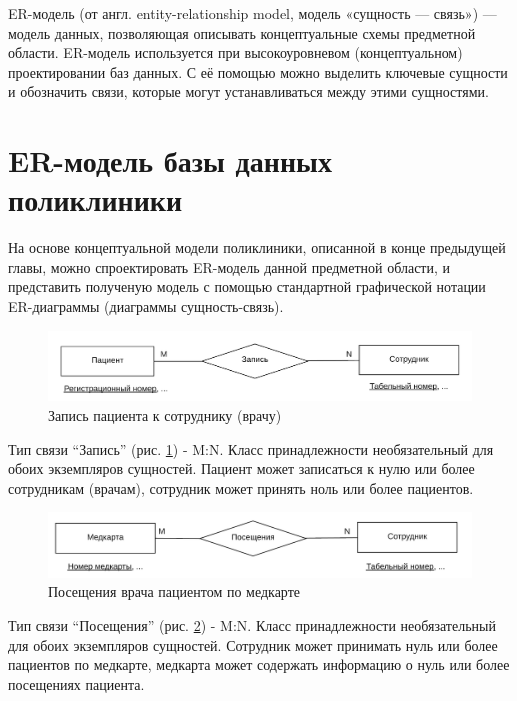 \documentclass[14pt,a4paper,russian]{extreport}
\begin{document}
ER-модель (от англ. entity-relationship model, модель «сущность — связь») — модель данных,
позволяющая описывать концептуальные схемы предметной области.  ER-модель используется при
высокоуровневом (концептуальном) проектировании баз данных. С её помощью можно выделить ключевые
сущности и обозначить связи, которые могут устанавливаться между этими сущностями.\cite{dbdesign}


\vspace{0.7cm}
\section{ER-модель базы данных поликлиники}
На основе концептуальной модели поликлиники, описанной в конце предыдущей главы, можно
спроектировать ER-модель данной предметной области, и представить полученую модель с
помощью стандартной графической нотации ER-диаграммы (диаграммы сущность-связь).
\cleardoublepage
\begin{figure}[h!]
        \includegraphics[width=\textwidth]{patappemp}
        \caption{Запись пациента к сотруднику (врачу)}
        \label{fig:patappemp}
\end{figure}

Тип связи ``Запись'' (рис. \ref{fig:patappemp}) - M:N.
Класс принадлежности необязательный для обоих экземпляров сущностей.
Пациент может записаться к нулю или более сотрудникам (врачам), сотрудник может принять ноль или более
пациентов. 

\begin{figure}[h!]
        \includegraphics[width=\textwidth]{medcvisemp}
        \caption{Посещения врача пациентом по медкарте}
        \label{fig:medcvisemp}
\end{figure}

Тип связи ``Посещения'' (рис. \ref{fig:medcvisemp}) - M:N.
Класс принадлежности необязательный для обоих экземпляров сущностей.
Сотрудник может принимать нуль или более пациентов по медкарте, медкарта может
содержать информацию о нуль или более посещениях пациента.
\end{document}
